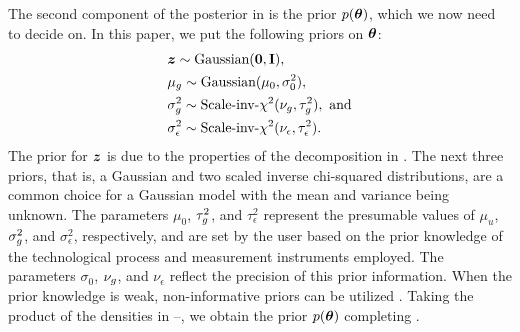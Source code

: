 The second component of the posterior in  is the prior $p(\boldsymbol{\theta})$,
which we now need to decide on. In this paper, we put the following priors on
$\boldsymbol{\theta}$:
\begin{align}
  & \vz \sim \text{Gaussian}(\v{0}, \m{I}), \elab{z-prior} \\
  & \mu_\g \sim \text{Gaussian}(\mu_0, \sigma^2_0), \elab{mu-u-prior} \\
  & \sigma^2_\g \sim \text{Scale-inv-$\chi^2$}(\nu_\g, \tau^2_\g), \text{ and} \elab{sigma2-u-prior} \\
  & \sigma^2_\epsilon \sim \text{Scale-inv-$\chi^2$}(\nu_\epsilon, \tau^2_\epsilon). \elab{sigma2-noise-prior}
\end{align}
The prior for $\boldsymbol{z}$ is due to the properties of the decomposition in
. The next three priors, that is, a Gaussian and two
scaled inverse chi-squared distributions, are a common choice for a Gaussian
model with the mean and variance being unknown. The parameters $\mu_0$,
$\tau^2_g$, and $\tau^2_\epsilon$ represent the presumable values of $\mu_u$,
$\sigma^2_g$, and $\sigma^2_\epsilon$, respectively, and are set by the user
based on the prior knowledge of the technological process and measurement
instruments employed. The parameters $\sigma_0$, $\nu_g$, and $\nu_\epsilon$
reflect the precision of this prior information. When the prior knowledge is
weak, non-informative priors can be utilized \cite{gelman2004}. Taking the
product of the densities in --, we obtain
the prior $p(\boldsymbol{\theta})$ completing .

